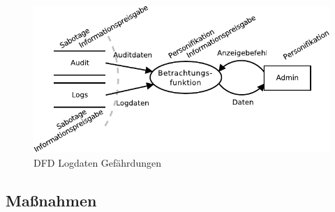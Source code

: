\documentclass[11pt,a4paper]{report}
\begin{document}
\begin{figure}[htbp]
\centering
\includegraphics[scale=1.2]{images/dfd_logs_threats.pdf}
\caption{DFD Logdaten Gefährdungen}
\label{fig:dfd_logs_threat}
\end{figure}

\subsection{Maßnahmen}
\end{document}
